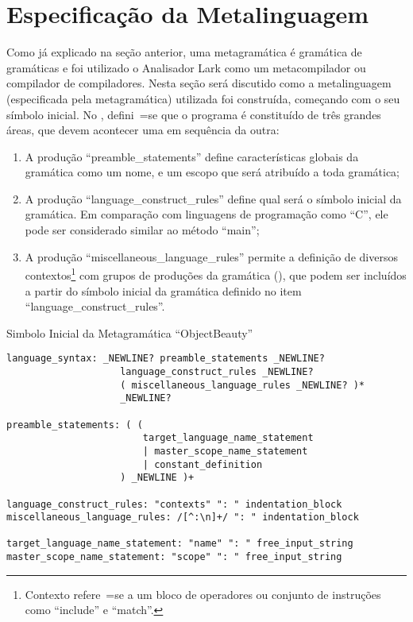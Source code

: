 \section{Especificação da Metalinguagem}
\label{metalinguagemGrammar}

Como já explicado na seção anterior,
uma metagramática é gramática de gramáticas e
foi utilizado o Analisador Lark como um metacompilador ou
compilador de compiladores.
Nesta seção será discutido como a metalinguagem (especificada pela metagramática) utilizada foi construída,
começando com o seu símbolo inicial.
No ,
defini~=se que o programa é constituído de três grandes áreas,
que devem acontecer uma em sequência da outra:
\begin{enumerate}
\item A produção ``preamble\_statements'' define características globais da gramática como um nome,
e um escopo que será atribuído a toda gramática;
\item A produção ``language\_construct\_rules'' define qual será o símbolo inicial da gramática.
Em comparação com linguagens de programação como ``C'',
ele pode ser considerado similar ao método ``main'';
\item A produção ``miscellaneous\_language\_rules'' permite a definição de diversos contextos\footnote{
Contexto refere~=se a um bloco de operadores ou
conjunto de instruções como ``include'' e
``match''.
} com grupos de produções da gramática (),
que podem ser incluídos a partir do símbolo inicial da gramática definido no item ``language\_construct\_rules''.
\end{enumerate}%
\begin{code}
\caption{Simbolo Inicial da Metagramática ``ObjectBeauty''}
\label{simboloInicialDaMetagramatica}
\begin{verbatim}
language_syntax: _NEWLINE? preamble_statements _NEWLINE?
                    language_construct_rules _NEWLINE?
                    ( miscellaneous_language_rules _NEWLINE? )*
                    _NEWLINE?

preamble_statements: ( (
                        target_language_name_statement
                        | master_scope_name_statement
                        | constant_definition
                    ) _NEWLINE )+

language_construct_rules: "contexts" ": " indentation_block
miscellaneous_language_rules: /[^:\n]+/ ": " indentation_block

target_language_name_statement: "name" ": " free_input_string
master_scope_name_statement: "scope" ": " free_input_string
\end{verbatim}
\end{code}

